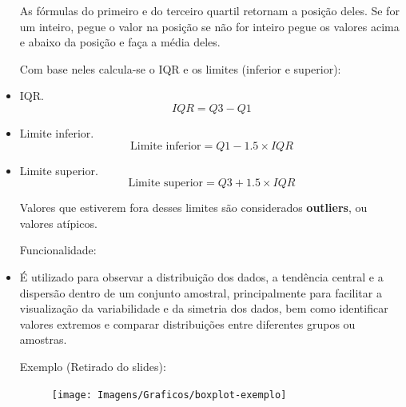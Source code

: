 \documentclass[a4paper,11pt]{article}
\begin{document}
\begin{itemize}
As fórmulas do primeiro e do terceiro quartil retornam a posição deles. Se for um inteiro, pegue o valor na posição se não for inteiro pegue os valores acima e abaixo da posição e faça a média deles.

\vspace{5mm} %

    Com base neles calcula-se o IQR e os limites (inferior e superior):

    \item IQR.
        \[IQR = Q3 - Q1\]
    \item Limite inferior.
        \[\text{Limite inferior} = Q1 - 1.5 \times IQR\]
    \item Limite superior.
        \[\text{Limite superior} = Q3 + 1.5 \times IQR\]

    Valores que estiverem fora desses limites são considerados \textbf{outliers}, ou valores atípicos.
    
\vspace{5mm} %

    Funcionalidade:
    \item É utilizado para observar a distribuição dos dados, a tendência central e a dispersão dentro de um conjunto amostral, principalmente para facilitar a visualização da variabilidade e da simetria dos dados, bem como identificar valores extremos e comparar distribuições entre diferentes grupos ou amostras.

\vspace{5mm} %

    Exemplo (Retirado do slides):
    \begin{figure}[!h] 
        \centering
        \texttt{[image: Imagens/Graficos/boxplot-exemplo]} 
    \end{figure}

\end{itemize}
\end{document}
